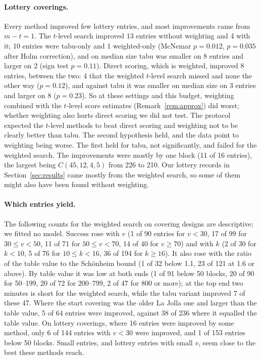 \documentclass[11pt]{article}
\theoremstyle{remark}
\begin{document}
\paragraph{Lottery coverings.} Every method improved few lottery entries, and most improvements came from $m-t=1$.
The $t$-level search improved 13 entries without weighting and 4 with it; 10 entries were tabu-only and 1
weighted-only (McNemar $p=0.012$, $p=0.035$ after Holm correction), and on median size tabu was smaller on 8 entries and
larger on 2 (sign test $p=0.11$). Direct scoring, which is weighted, improved 8 entries, between the two: 4 that the
weighted $t$-level search missed and none the other way ($p=0.12$), and against tabu it was smaller on median size on 3
entries and larger on 8 ($p=0.23$). So at these settings and this budget, weighting combined with the $t$-level score
estimates (Remark~\ref{rem:approx}) did worst; whether weighting also hurts direct scoring we did not test. The protocol
expected the $t$-level methods to beat direct scoring and weighting not to be clearly better than tabu. The second
hypothesis held, and the data point to weighting being worse. The first held for tabu, not significantly, and failed
for the weighted search. The improvements were mostly by one block (11 of 16 entries), the largest being
$C(45,12,4,5)$ from 226 to 210. Our lottery records in Section~\ref{sec:results} came mostly from the weighted search,
so some of them might also have been found without weighting.

\paragraph{Which entries yield.} The following counts for the weighted search on covering designs are descriptive; we
fitted no model. Success rose with $v$ (1 of 90 entries for $v<30$, 17 of 99 for $30\le v<50$, 11 of 71 for
$50\le v<70$, 14 of 40 for $v\ge 70$) and with $k$ (2 of 30 for $k<10$, 5 of 76 for $10\le k<16$, 36 of 194 for
$k\ge 16$). It also rose with the ratio of the table value to the Sch\"onheim bound (1 of 32 below 1.1, 23 of 121 at
1.6 or above). By table value it was low at both ends (1 of 91 below 50 blocks, 20 of 90 for 50--199, 20 of 72 for
200--799, 2 of 47 for 800 or more); at the top end two minutes is short for the weighted search, while the tabu variant
improved 7 of these 47. Where the start covering was the older La Jolla one and larger than the table value, 5 of 64
entries were improved, against 38 of 236 where it equalled the table value. On lottery coverings, where 16 entries were
improved by some method, only 6 of 144 entries with $v<30$ were improved, and 1 of 153 entries below 50 blocks. Small
entries, and lottery entries with small $v$, seem close to the best these methods reach.
\end{document}
